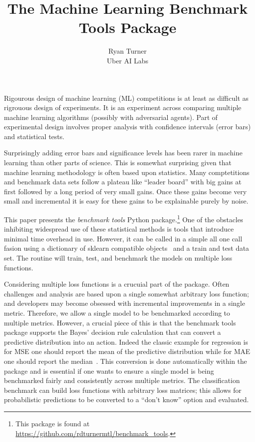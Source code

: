 \documentclass{article}
\title{The Machine Learning Benchmark Tools Package}
\author{
  Ryan Turner \\
  Uber AI Labs
}
\begin{document}

\maketitle

Rigourous design of machine learning (ML) competitions is at least as difficult as rigrouous design of experiments.
It is an experiment across comparing multiple machine learning algorithms (possibly with adversarial agents)\@.
Part of experimental design involves proper analysis with confidence intervals (error bars) and statistical tests.

Surprisingly adding error bars and significance levels has been rarer in machine learning than other parts of science.
This is somewhat surprising given that machine learning methodology is often based upon statistics.
Many comptetitions and benchmark data sets follow a plateau like ``leader board'' with big gains at first followed by a long period of very small gains.
Once these gains become very small and incremental it is easy for these gains to be explainable purely by noise.

This paper presents the \emph{benchmark tools} Python package.\footnote{This package is found at
\url{https://github.com/rdturnermtl/benchmark_tools}.}
One of the obstacles inhibiting widespread use of these statistical methods is tools that introduce minimal time overhead in use.
However, it can be called in a simple all one call fasion using a dictionary of sklearn compatible objects~\citep{Pedregosa2011} and a train and test data set.
The routine will train, test, and benchmark the models on multiple loss functions.

Considering multiple loss functions is a crucuial part of the package.
Often challenges and analysis are based upon a single somewhat arbitrary loss function; and developers may become obsessed with incremental improvements in a single metric.
Therefore, we allow a single model to be benchmarked according to multiple metrics.
However, a crucial piece of this is that the benchmark tools package supports the Bayes' decision rule calculation that can convert a predictive distribution into an action.
Indeed the classic example for regression is for MSE one should report the mean of the predictive distribution while for MAE one should report the median~\citep{Marchini2013}.
This conversion is done automatically within the package and is essential if one wants to ensure a single model is being benchmarked fairly and consistently across multiple metrics.
The classification benchmark can build loss functions with arbitrary loss matrices; this allows for probabilistic predictions to be converted to a ``don't know'' option and evaluated.
\end{document}

